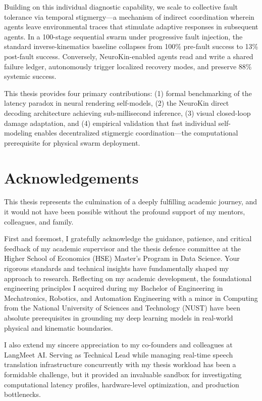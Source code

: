 \documentclass[12pt,a4paper,oneside]{report}
\begin{document}
Building on this individual diagnostic capability, we scale to collective fault tolerance via temporal stigmergy---a mechanism of indirect coordination wherein agents leave environmental traces that stimulate adaptive responses in subsequent agents. In a 100-stage sequential swarm under progressive fault injection, the standard inverse-kinematics baseline collapses from 100\% pre-fault success to 13\% post-fault success. Conversely, NeuroKin-enabled agents read and write a shared failure ledger, autonomously trigger localized recovery modes, and preserve 88\% systemic success.

This thesis provides four primary contributions: (1) formal benchmarking of the latency paradox in neural rendering self-models, (2) the NeuroKin direct decoding architecture achieving sub-millisecond inference, (3) visual closed-loop damage adaptation, and (4) empirical validation that fast individual self-modeling enables decentralized stigmergic coordination---the computational prerequisite for physical swarm deployment.
\clearpage

\chapter*{Acknowledgements}

This thesis represents the culmination of a deeply fulfilling academic journey, and it would not have been possible without the profound support of my mentors, colleagues, and family. 

First and foremost, I gratefully acknowledge the guidance, patience, and critical feedback of my academic supervisor and the thesis defence committee at the Higher School of Economics (HSE) Master's Program in Data Science. Your rigorous standards and technical insights have fundamentally shaped my approach to research. Reflecting on my academic development, the foundational engineering principles I acquired during my Bachelor of Engineering in Mechatronics, Robotics, and Automation Engineering with a minor in Computing from the National University of Sciences and Technology (NUST) have been absolute prerequisites in grounding my deep learning models in real-world physical and kinematic boundaries.

I also extend my sincere appreciation to my co-founders and colleagues at LangMeet AI. Serving as Technical Lead while managing real-time speech translation infrastructure concurrently with my thesis workload has been a formidable challenge, but it provided an invaluable sandbox for investigating computational latency profiles, hardware-level optimization, and production bottlenecks.
\end{document}
